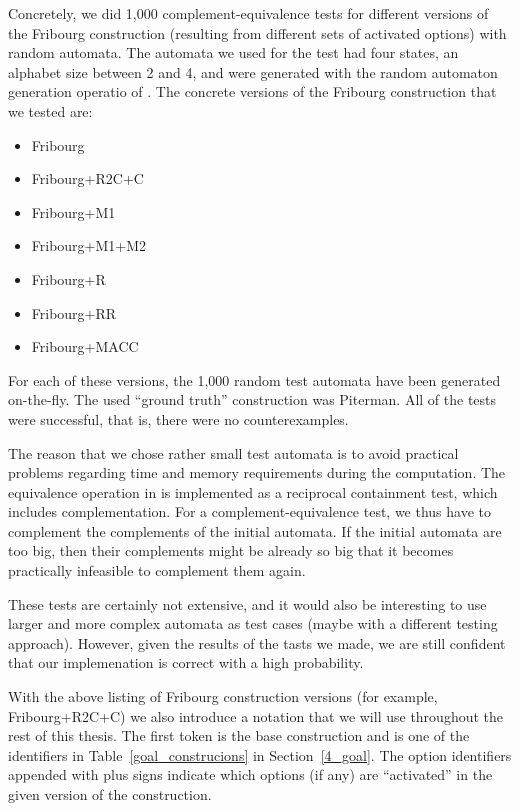Concretely, we did 1,000 complement-equivalence tests for different versions of the Fribourg construction (resulting from different sets of activated options) with random automata. The automata we used for the test had four states, an alphabet size between 2 and 4, and were generated with the random automaton generation operatio of \goal. The concrete versions of the Fribourg construction that we tested are:
\begin{itemize}
\item Fribourg
\item Fribourg+R2C+C
\item Fribourg+M1
\item Fribourg+M1+M2
\item Fribourg+R
\item Fribourg+RR
\item Fribourg+MACC
\end{itemize}
For each of these versions, the 1,000 random test automata have been generated on-the-fly. The used ``ground truth'' construction was Piterman. All of the tests were successful, that is, there were no counterexamples.

The reason that we chose rather small test automata is to avoid practical problems regarding time and memory requirements during the computation. The equivalence operation in \goal{} is implemented as a reciprocal containment test, which includes complementation. For a complement-equivalence test, we thus have to complement the complements of the initial automata. If the initial automata are too big, then their complements might be already so big that it becomes practically infeasible to complement them again.

These tests are certainly not extensive, and it would also be interesting to use larger and more complex automata as test cases (maybe with a different testing approach). However, given the results of the tasts we made, we are still confident that our implemenation is correct with a high probability. 

With the above listing of Fribourg construction versions (for example, Fribourg+R2C+C) we also introduce a notation that we will use throughout the rest of this thesis. The first token is the base construction and is one of the identifiers in Table~\ref{goal_construcions} in Section~\ref{4_goal}. The option identifiers appended with plus signs indicate which options (if any) are ``activated'' in the given version of the construction.


